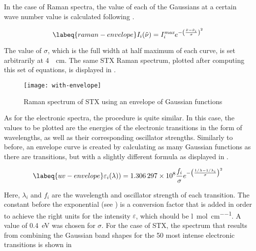 In the case of Raman spectra, the value of each of the Gaussians at a certain wave number value is calculated following .

\begin{equation}
    \labeq{raman-envelope}
    I_i (\tilde{\nu}) = I_i^\textit{max}e^{-\left(\frac{\tilde{\nu} - \tilde{\nu}_i}{\sigma}\right)^2}
\end{equation}

The value of $\sigma$, which is the full width at half maximum of each curve, is set arbitrarily at \SI{4}{\per\cm}.
The same STX Raman spectrum, plotted after computing this set of equations, is displayed in .

\begin{figure}
    \centering
    \texttt{[image: with-envelope]}
    \caption[Raman spectrum with Gaussian envelope]{Raman spectrum of STX using an envelope of Gaussian functions}
\end{figure}

As for the electronic spectra, the procedure is quite similar.
In this case, the values to be plotted are the energies of the electronic transitions in the form of wavelengths, as well as their corresponding oscillator strengths.
Similarly to before, an envelope curve is created by calculating as many Gaussian functions as there are transitions, but with a slightly different formula as displayed in .

\begin{equation}
    \labeq{uv-envelope}
    \varepsilon_i (\lambda)) = \num{1.306297e8} \frac{f_i}{\sigma} e^{-\left(\frac{1/\lambda - 1/\lambda_i}{\sigma}\right)^2}
\end{equation}

Here, $\lambda_i$ and $f_i$ are the wavelength and oscillator strength of each transition. The constant before the exponential (see ) is a conversion factor that is added in order to achieve the right units for the intensity $\varepsilon$, which should be \si{\litre\per\mole\per\cm}.
A value of \SI{0.4}{\eV} was chosen for $\sigma$.
For the case of STX, the spectrum that results from combining the Gaussian band shapes for the 50 most intense electronic transitions is shown in 

